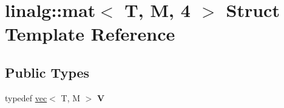 \hypertarget{structlinalg_1_1mat_3_01T_00_01M_00_014_01_4}{}\section{linalg\+:\+:mat$<$ T, M, 4 $>$ Struct Template Reference}
\label{structlinalg_1_1mat_3_01T_00_01M_00_014_01_4}
\subsection*{Public Types}
\begin{DoxyCompactItemize}
\item 
typedef \hyperlink{structlinalg_1_1vec}{vec}$<$ T, M $>$ {\bfseries V}\hypertarget{structlinalg_1_1mat_3_01T_00_01M_00_014_01_4_a97fad88a5e3a784d15be05763d677a16}{}\label{structlinalg_1_1mat_3_01T_00_01M_00_014_01_4_a97fad88a5e3a784d15be05763d677a16}

\end{DoxyCompactItemize}
